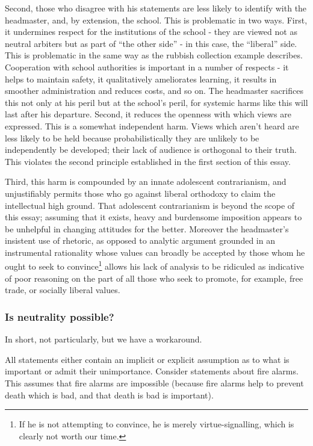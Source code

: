 \documentclass[12pt,a4paper]{report}
\begin{document}
\begin{multicols}{2}
\begin{multicols}{2}
Second, those who disagree with his statements are less likely to
identify with the headmaster, and, by extension, the school. This is
problematic in two ways. First, it undermines respect for the
institutions of the school - they are viewed not as neutral arbiters but
as part of ``the other side'' - in this case, the ``liberal'' side. This
is problematic in the same way as the rubbish collection example
describes. Cooperation with school authorities is important in a number
of respects - it helps to maintain safety, it qualitatively ameliorates
learning, it results in smoother administration and reduces costs, and
so on. The headmaster sacrifices this not only at his peril but at the
school's peril, for systemic harms like this will last after his
departure. Second, it reduces the openness with which views are
expressed. This is a somewhat independent harm. Views which aren't heard
are less likely to be held because probabilistically they are unlikely
to be independently be developed; their lack of audience is orthogonal
to their truth. This violates the second principle established in the
first section of this essay.

Third, this harm is compounded by an innate adolescent contrarianism,
and unjustifiably permits those who go against liberal orthodoxy to
claim the intellectual high ground. That adolescent contrarianism is
beyond the scope of this essay; assuming that it exists, heavy and
burdensome imposition appears to be unhelpful in changing attitudes for
the better. Moreover the headmaster's insistent use of rhetoric, as
opposed to analytic argument grounded in an instrumental rationality
whose values can broadly be accepted by those whom he ought to seek to
convince\footnote{If he is not attempting to convince, he is merely
	virtue-signalling, which is clearly not worth our time.} allows his
lack of analysis to be ridiculed as indicative of poor reasoning on the
part of all those who seek to promote, for example, free trade, or
socially liberal values.

\subsubsection{Is neutrality possible?}\label{is-neutrality-possible}

In short, not particularly, but we have a workaround.

All statements either contain an implicit or explicit assumption as to
what is important or admit their unimportance. Consider statements about
fire alarms. This assumes that fire alarms are impossible (because fire
alarms help to prevent death which is bad, and that death is bad is
important).


\end{multicols}
\end{multicols}
\end{document}
